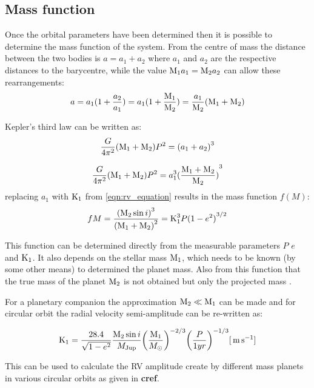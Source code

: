 \subsection{Mass function}

Once the orbital parameters have been determined then it is possible to determine the mass function of the system. From the centre of mass the distance between the two bodies is \(a = a_1 + a_2\) where $a_1$ and $a_2$ are the respective distances to the barycentre, while the value \(\textrm{M}_{1} a_1 = \textrm{M}_{2} a_2\) can allow these rearrangements:
\begin{equation}
a = a_{1} (1 + \frac{a_{2}}{a_{1}}) = a_{1}(1 + \frac{\textrm{M}_{1}}{\textrm{M}_{2}}) = \frac{a_{1}}{\textrm{M}_{2}} (\textrm{M}_{1} + \textrm{M}_{2})
\end{equation}

Kepler's third law can be written as:
\begin{equation}
    \frac{G}{4\pi^{2}}(\textrm{M}_{1} + \textrm{M}_{2})P^{2} = {(a_1 + a_2)}^{3}
\end{equation}

\begin{equation}
\frac{G}{4\pi^{2}}(\textrm{M}_{1} + \textrm{M}_{2})P^{2} = a_{1}^{3}{(\frac{\textrm{M}_{1} + \textrm{M}_{2}}{\textrm{M}_{2}})}^{3}
\end{equation}
replacing $a_{1}$ with $\textrm{K}_{1}$ from \cref{eqn:rv_equation} results in the mass function $f(M)$:
\begin{equation}
f{M} = \frac{{(\textrm{M}_{2}\sin{i})}^{3}}{{(\textrm{M}_{1} + \textrm{M}_{2})}^{2}} = \textrm{K}_{1}^{3} P {(1-e^{2})}^{3/2}
\end{equation}

This function can be determined directly from the measurable parameters $P$ $e$ and $\textrm{K}_{1}$. It also depends on the stellar mass $\textrm{M}_{1}$, which needs to be known  (by some other means) to determined the planet mass. Also from this function that the true mass of the planet $\textrm{M}_{2}$ is not obtained but only the projected mass \Mtwosini.

For a planetary companion the approximation $\textrm{M}_{2} \ll \textrm{M}_{1}$ can be made and for circular orbit the radial velocity semi-amplitude can be re-written as:

\begin{equation}
\textrm{K}_{1} = \frac{28.4}{\sqrt{1-e^{2}}} \frac{\textrm{M}_{2}\sin{i}}{M_{\mathrm{Jup}}} {\left(\frac{\textrm{M}_{1}}{M_{\odot}}\right)}^{-2/3} {\left(\frac{P}{1 yr}\right)}^{-1/3}  [\,\si{\meter\per\second}] \label{eqn:k_relation}
\end{equation}

This can be used to calculate the RV amplitude create by different mass planets in various circular orbits as given in \textbf{cref{}}.

